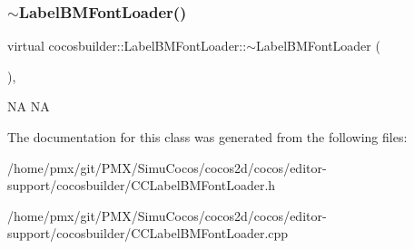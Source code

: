 \subsubsection{\texorpdfstring{$\sim$\+Label\+B\+M\+Font\+Loader()}{~LabelBMFontLoader()}\hspace{0.1cm}{\footnotesize\ttfamily [2/2]}}
{\footnotesize\ttfamily virtual cocosbuilder\+::\+Label\+B\+M\+Font\+Loader\+::$\sim$\+Label\+B\+M\+Font\+Loader (\begin{DoxyParamCaption}{ }\end{DoxyParamCaption})\hspace{0.3cm}{\ttfamily [inline]}, {\ttfamily [virtual]}}

NA  NA 

The documentation for this class was generated from the following files\+:\begin{DoxyCompactItemize}
\item 
/home/pmx/git/\+P\+M\+X/\+Simu\+Cocos/cocos2d/cocos/editor-\/support/cocosbuilder/C\+C\+Label\+B\+M\+Font\+Loader.\+h\item 
/home/pmx/git/\+P\+M\+X/\+Simu\+Cocos/cocos2d/cocos/editor-\/support/cocosbuilder/C\+C\+Label\+B\+M\+Font\+Loader.\+cpp\end{DoxyCompactItemize}
